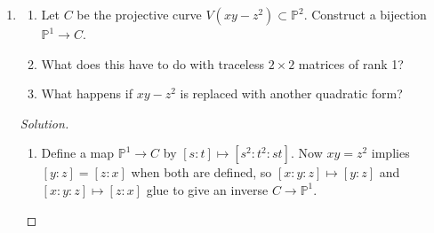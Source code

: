 \documentclass{article}
\theoremstyle{definition}
\renewcommand{\P}{\mathbb{P}}
\newcommand{\A}{\mathbb{A}}
\newcommand{\C}{\mathbb{C}}
\begin{document}
\begin{enumerate}
        \begin{proof}[Solution]
            Suppose $f\in\C[x_1,\ldots,x_n]$ defines a hypersurface
            $V=V(f)\subseteq\A^n$. We obtain a homogeneous polynomial
            $\hat f\in\C[x_1,\ldots,x_{n+1}]$ by
            \begin{equation*}
                \hat f
                    = x_{n+1}^{\deg f}\cdot f(x_1/x_{n+1},\ldots,x_n/x_{n+1}),
            \end{equation*}
            giving a projective hypersurface in $\P^n$ whose intersection with
            the affine part $x_{n+1}\ne0$ is $V(f)$. It is in fact the closure
            of this affine part in $\P^n$, since substituting $x_{n+1}=1$ and
            applying this process to a homogeneous polynomial recovers the
            original polynomial up to a multiple of $x_{n+1}$.
        \end{proof}

    \item
        \begin{enumerate}[label=(\alph*)]
            \item Let $C$ be the projective curve $V(xy-z^2)\subset\P^2$.
                Construct a bijection $\P^1\to C$.

            \item What does this have to do with traceless $2\times2$ matrices
                of rank 1?

            \item What happens if $xy-z^2$ is replaced with another quadratic
                form?
        \end{enumerate}

        \begin{proof}[Solution]
            \begin{enumerate}[label=(\alph*)]
                \item Define a map $\P^1\to C$ by $[s:t]\mapsto[s^2:t^2:st]$.
                    Now $xy=z^2$ implies $[y:z]=[z:x]$ when both are defined, so
                    $[x:y:z]\mapsto[y:z]$ and $[x:y:z]\mapsto[z:x]$ glue to give
                    an inverse $C\to\P^1$.


\end{enumerate}
\end{proof}
\end{enumerate}
\end{document}
